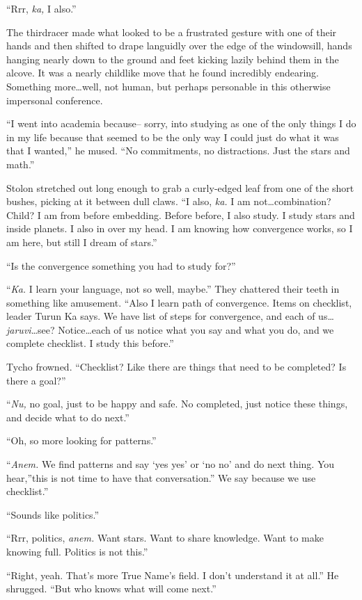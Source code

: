 ``Rrr, \emph{ka,} I also.''

The thirdracer made what looked to be a frustrated gesture with one of their hands and then shifted to drape languidly over the edge of the windowsill, hands hanging nearly down to the ground and feet kicking lazily behind them in the alcove. It was a nearly childlike move that he found incredibly endearing. Something more\ldots well, not human, but perhaps personable in this otherwise impersonal conference.

``I went into academia because-- sorry, into studying as one of the only things I do in my life because that seemed to be the only way I could just do what it was that I wanted,'' he mused. ``No commitments, no distractions. Just the stars and math.''

Stolon stretched out long enough to grab a curly-edged leaf from one of the short bushes, picking at it between dull claws. ``I also, \emph{ka.} I am not\ldots combination? Child? I am from before embedding. Before before, I also study. I study stars and inside planets. I also in over my head. I am knowing how convergence works, so I am here, but still I dream of stars.''

``Is the convergence something you had to study for?''

``\emph{Ka.} I learn your language, not so well, maybe.'' They chattered their teeth in something like amusement. ``Also I learn path of convergence. Items on checklist, leader Turun Ka says. We have list of steps for convergence, and each of us\ldots{}\emph{jaruvi}\ldots see? Notice\ldots each of us notice what you say and what you do, and we complete checklist. I study this before.''

Tycho frowned. ``Checklist? Like there are things that need to be completed? Is there a goal?''

``\emph{Nu,} no goal, just to be happy and safe. No completed, just notice these things, and decide what to do next.''

``Oh, so more looking for patterns.''

``\emph{Anem.} We find patterns and say `yes yes' or `no no' and do next thing. You hear,''this is not time to have that conversation.'' We say because we use checklist.''

``Sounds like politics.''

``Rrr, politics, \emph{anem.} Want stars. Want to share knowledge. Want to make knowing full. Politics is not this.''

``Right, yeah. That's more True Name's field. I don't understand it at all.'' He shrugged. ``But who knows what will come next.''


